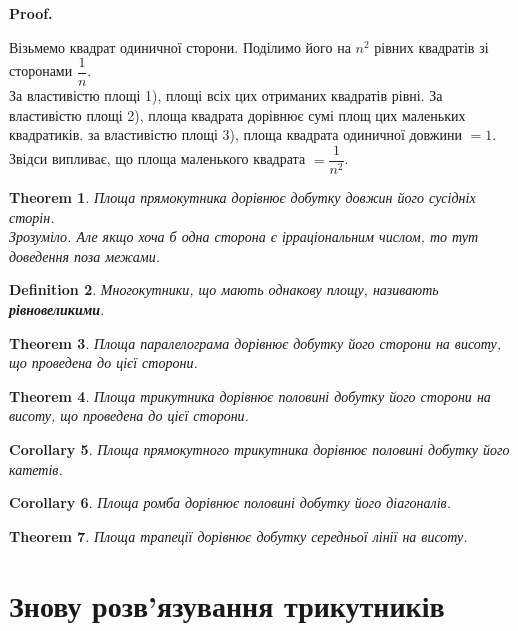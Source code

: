 \documentclass[a4paper, 10pt]{article}
\makeatletter
\def\qed{$\blacksquare$}
\theoremstyle{theoremdd}
\newtheorem{theorem}{Theorem}[subsection]
\theoremstyle{theoremdd}
\theoremstyle{theoremdd}
\newtheorem{definition}[theorem]{Definition}
\theoremstyle{theoremdd}
\theoremstyle{theoremdd}
\theoremstyle{theoremdd}
\theoremstyle{theoremdd}
\theoremstyle{theoremdd}
\theoremstyle{theoremdd}
\newtheorem{corollary}[theorem]{Corollary}
\renewenvironment{proof}[1][Proof.\\]{\par
\pushQED{\hfill \qed}%
\normalfont \topsep6\p@\@plus6\p@\relax
\trivlist
\item\relax
{\bfseries
#1\@addpunct{.}}\hspace\labelsep\ignorespaces
}{%
\popQED\endtrivlist\@endpefalse
}
\makeatother
\begin{document}
\begin{proof}
Візьмемо квадрат одиничної сторони. Поділимо його на $n^2$ рівних квадратів зі сторонами $\dfrac{1}{n}$.\\
За властивістю площі 1), площі всіх цих отриманих квадратів рівні. За властивістю площі 2), площа квадрата дорівнює сумі площ цих маленьких квадратиків. за властивістю площі 3), площа квадрата одиничної довжини $= 1$.\\
Звідси випливає, що площа маленького квадрата $= \dfrac{1}{n^2}$.
\end{proof}

\begin{theorem}
Площа прямокутника дорівнює добутку довжин його сусідніх сторін.\\
\textit{Зрозуміло. Але якщо хоча б одна сторона є ірраціональним числом, то тут доведення поза межами.}
\end{theorem}

\begin{definition}
Многокутники, що мають однакову площу, називають \textbf{рівновеликими}.
\end{definition}

\begin{theorem}
Площа паралелограма дорівнює добутку його сторони на висоту, що проведена до цієї сторони.
\end{theorem}

\begin{theorem}
Площа трикутника дорівнює половині добутку його сторони на висоту, що проведена до цієї сторони.
\end{theorem}

\begin{corollary}
Площа прямокутного трикутника дорівнює половині добутку його катетів.
\end{corollary}

\begin{corollary}
Площа ромба дорівнює половині добутку його діагоналів.
\end{corollary}

\begin{theorem}
Площа трапеції дорівнює добутку середньої лінії на висоту.
\end{theorem}

\newpage

\section{Знову розв'язування трикутників}
\end{document}
